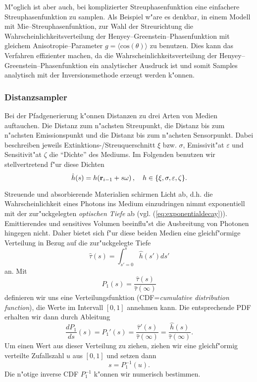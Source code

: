 	M"oglich ist aber auch, bei komplizierter Streuphasenfunktion eine einfachere Streuphasenfunktion zu samplen. Als Beispiel w"are es denkbar, in einem Modell mit Mie--Streuphasenfunktion, zur Wahl der Streurichtung die Wahrscheinlichkeitsverteilung der Henyey--Greenstein--Phasenfunktion mit gleichem Anisotropie--Parameter $g=\langle \text{cos}(\theta)\rangle$ zu benutzen. Dies kann das Verfahren effizienter machen, da die Wahrscheinlichkeitsverteilung der Henyey--Greenstein--Phasenfunktion ein analytischer Ausdruck ist und somit Samples analytisch mit der Inversionsmethode erzeugt werden k"onnen.
	
	\subsubsection{Distanzsampler}
	Bei der Pfadgenerierung k"onnen Distanzen zu drei Arten von Medien auftauchen. Die Distanz zum n"achsten Streupunkt, die Distanz bis zum n"achsten Emissionspunkt und die Distanz bis zum n"achsten Sensorpunkt. Dabei beschreiben jeweils Extinktions-/Streuquerschnitt $\xi$ bzw. $\sigma$, Emissivit"at $\varepsilon$ und Sensitivit"at $\zeta$ die ``Dichte'' des Mediums. Im Folgenden benutzen wir stellvertretend f"ur diese Dichten
	$${\hat h}(s)=h(\mathbf{r}_{i-1}+s\omega)\,,\quad h\in\{\xi,\sigma,\varepsilon,\zeta\}.$$
	
	Streuende und absorbierende Materialien schirmen Licht ab, d.h. die Wahrscheinlichkeit eines Photons ins Medium einzudringen nimmt exponentiell mit der zur"uckgelegten {\em optischen Tiefe} ab (vgl. (\ref{eq:exponentialdecay})). Emittierendes und sensitives Volumen beeinflu"st die Ausbreitung von Photonen hingegen nicht. Daher bietet sich f"ur diese beiden Medien eine gleichf"ormige Verteilung in Bezug auf die zur"uckgelegte Tiefe
	$${\hat \tau}(s)=\int_{s'=0}^s {\hat h}(s')ds'$$
	an. Mit
	$$P_1(s)=\frac{{\hat \tau}(s)}{{\hat \tau}(\infty)}$$
	definieren wir uns eine Verteilungsfunktion (CDF={\em cumulative distribution function}), die Werte im Intervall $[0,1]$ annehmen kann. Die entsprechende PDF erhalten wir dann durch Ableitung
	$$\frac{dP_1}{ds}(s)=P_1'(s)=\frac{{\hat \tau}'(s)}{{\hat \tau}(\infty)}=\frac{{\hat h}(s)}{{\hat \tau}(\infty)}.$$
	Um einen Wert aus dieser Verteilung zu ziehen, ziehen wir eine gleichf"ormig verteilte Zufallszahl $u$ aus $[0,1]$ und setzen dann
	$$s=P_1^{-1}(u).$$
	Die n"otige inverse CDF $P_1^{-1}$ k"onnen wir numerisch bestimmen.
	
